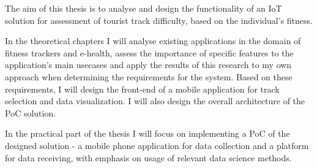 The aim of this thesis is to analyse and design the functionality  of an IoT solution for assessment of tourist track difficulty, based on the individual's fitness.

In the theoretical chapters I will analyse existing applications in the domain of fitness trackers and e-health, assess the importance of specific features to the application's main usecases
and apply the results of this research to my own approach when determining the requirements for the system.
Based on these requirements, I will design the front-end of a mobile application for track selection and data visualization.
I will also design the overall architecture of the PoC solution.

In the practical part of the thesis I will focus on implementing a PoC of the designed solution - a mobile phone application for data collection and a platform for data receiving, with emphasis on usage of relevant data science methods. 
